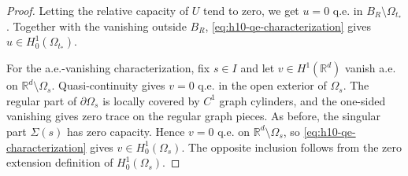 \documentclass[11pt]{amsart}
\numberwithin{equation}{section}
\numberwithin{figure}{section}
\theoremstyle{plain}
\theoremstyle{definition}
\theoremstyle{remark}
\theoremstyle{plain}
\def\R{\mathbb{R}}
\begin{document}
\begin{proof}
Letting the relative capacity of $U$ tend to zero, we get $u=0$ q.e. in $B_R\setminus\Omega_{t_*}$. Together with the vanishing outside $B_R$, \eqref{eq:h10-qe-characterization} gives $u\in H^1_0(\Omega_{t_*})$.

For the a.e.-vanishing characterization, fix $s\in I$ and let $v\in H^1(\R^d)$ vanish a.e. on $\R^d\setminus\Omega_s$. Quasi-continuity gives $v=0$ q.e. in the open exterior of $\Omega_s$. The regular part of $\partial\Omega_s$ is locally covered by $C^1$ graph cylinders, and the one-sided vanishing gives zero trace on the regular graph pieces. As before, the singular part $\Sigma(s)$ has zero capacity. Hence $v=0$ q.e. on $\R^d\setminus\Omega_s$, so \eqref{eq:h10-qe-characterization} gives $v\in H^1_0(\Omega_s)$. The opposite inclusion follows from the zero extension definition of $H^1_0(\Omega_s)$.
\end{proof}
\end{document}
